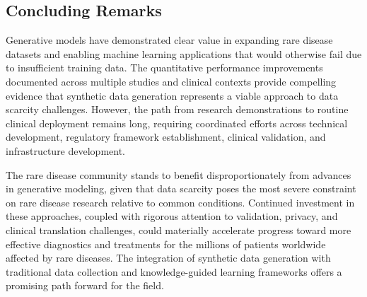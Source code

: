 \subsection{Concluding Remarks}

Generative models have demonstrated clear value in expanding rare disease datasets and enabling machine learning applications that would otherwise fail due to insufficient training data. The quantitative performance improvements documented across multiple studies and clinical contexts provide compelling evidence that synthetic data generation represents a viable approach to data scarcity challenges. However, the path from research demonstrations to routine clinical deployment remains long, requiring coordinated efforts across technical development, regulatory framework establishment, clinical validation, and infrastructure development.

The rare disease community stands to benefit disproportionately from advances in generative modeling, given that data scarcity poses the most severe constraint on rare disease research relative to common conditions. Continued investment in these approaches, coupled with rigorous attention to validation, privacy, and clinical translation challenges, could materially accelerate progress toward more effective diagnostics and treatments for the millions of patients worldwide affected by rare diseases. The integration of synthetic data generation with traditional data collection and knowledge-guided learning frameworks offers a promising path forward for the field.
